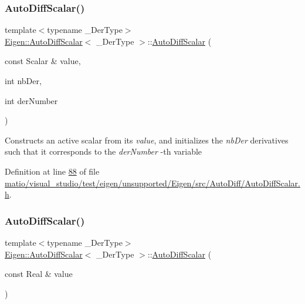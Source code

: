 \subsubsection{\texorpdfstring{Auto\+Diff\+Scalar()}{AutoDiffScalar()}\hspace{0.1cm}{\footnotesize\ttfamily [6/8]}}
{\footnotesize\ttfamily template$<$typename \+\_\+\+Der\+Type$>$ \\
\hyperlink{class_eigen_1_1_auto_diff_scalar}{Eigen\+::\+Auto\+Diff\+Scalar}$<$ \+\_\+\+Der\+Type $>$\+::\hyperlink{class_eigen_1_1_auto_diff_scalar}{Auto\+Diff\+Scalar} (\begin{DoxyParamCaption}\item[{const Scalar \&}]{value,  }\item[{int}]{nb\+Der,  }\item[{int}]{der\+Number }\end{DoxyParamCaption})\hspace{0.3cm}{\ttfamily [inline]}}

Constructs an active scalar from its {\itshape value}, and initializes the {\itshape nb\+Der} derivatives such that it corresponds to the {\itshape der\+Number} -\/th variable 

Definition at line \hyperlink{matio_2visual__studio_2test_2eigen_2unsupported_2_eigen_2src_2_auto_diff_2_auto_diff_scalar_8h_source_l00088}{88} of file \hyperlink{matio_2visual__studio_2test_2eigen_2unsupported_2_eigen_2src_2_auto_diff_2_auto_diff_scalar_8h_source}{matio/visual\+\_\+studio/test/eigen/unsupported/\+Eigen/src/\+Auto\+Diff/\+Auto\+Diff\+Scalar.\+h}.

\mbox{\label{class_eigen_1_1_auto_diff_scalar_a14e0f5ecc595deb05aaf336f5a81b861}} 
\subsubsection{\texorpdfstring{Auto\+Diff\+Scalar()}{AutoDiffScalar()}\hspace{0.1cm}{\footnotesize\ttfamily [7/8]}}
{\footnotesize\ttfamily template$<$typename \+\_\+\+Der\+Type$>$ \\
\hyperlink{class_eigen_1_1_auto_diff_scalar}{Eigen\+::\+Auto\+Diff\+Scalar}$<$ \+\_\+\+Der\+Type $>$\+::\hyperlink{class_eigen_1_1_auto_diff_scalar}{Auto\+Diff\+Scalar} (\begin{DoxyParamCaption}\item[{const Real \&}]{value }\end{DoxyParamCaption})\hspace{0.3cm}{\ttfamily [inline]}}

